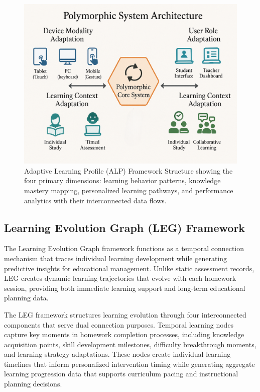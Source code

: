 \documentclass[conference]{IEEEtran}
\begin{document}
\begin{IEEEkeywords}
\begin{figure}[htbp]
\centerline{\includegraphics[width=\columnwidth]{1.png}}
\caption{Adaptive Learning Profile (ALP) Framework Structure showing the four primary dimensions: learning behavior patterns, knowledge mastery mapping, personalized learning pathways, and performance analytics with their interconnected data flows.}
\label{fig:alp_framework}
\end{figure}

\subsection{Learning Evolution Graph (LEG) Framework}

The Learning Evolution Graph framework functions as a temporal connection mechanism that traces individual learning development while generating predictive insights for educational management. Unlike static assessment records, LEG creates dynamic learning trajectories that evolve with each homework session, providing both immediate learning support and long-term educational planning data.

The LEG framework structures learning evolution through four interconnected components that serve dual connection purposes. Temporal learning nodes capture key moments in homework completion processes, including knowledge acquisition points, skill development milestones, difficulty breakthrough moments, and learning strategy adaptations. These nodes create individual learning timelines that inform personalized intervention timing while generating aggregate learning progression data that supports curriculum pacing and instructional planning decisions.


\end{IEEEkeywords}
\end{document}
